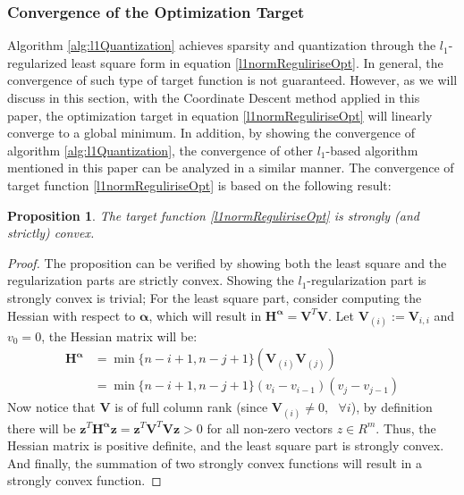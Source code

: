 \documentclass[preprint,10pt]{elsarticle}
\newtheorem{prop}{Proposition}
\begin{document}
\subsubsection{Convergence of the Optimization Target}
\label{subsubsec:convergence}
Algorithm \ref{alg:l1Quantization} achieves sparsity and quantization through the $l_1$-regularized least square form in equation \ref{l1normReguliriseOpt}. In general, the convergence of such type of target function is not guaranteed. However, as we will discuss in this section, with the Coordinate Descent method applied in this paper, the optimization target in equation \ref{l1normReguliriseOpt}  will linearly converge to a global minimum. In addition, by showing the convergence of algorithm \ref{alg:l1Quantization}, the convergence of other $l_1$-based algorithm mentioned in this paper can be analyzed in a similar manner. The convergence of target function \ref{l1normReguliriseOpt} is based on the following result:
\begin{prop}
The target function \ref{l1normReguliriseOpt} is strongly (and strictly) convex.
\end{prop}
\begin{proof}
The proposition can be verified by showing both the least square and the regularization parts are strictly convex. Showing the $l_1$-regularization part is strongly convex is trivial; For the least square part, consider computing the Hessian with respect to $\boldsymbol{\alpha}$, which will result in $\boldsymbol{H^{\alpha}} = \boldsymbol{V}^{T}\boldsymbol{V}$. Let $\boldsymbol{V}_{(i)} := \boldsymbol{V}_{i,i}$ and $v_{0} = 0$, the Hessian matrix will be: 
\begin{equation}
\label{equ:HessianOfLeastSquare}
\begin{split}
\boldsymbol{H^{\alpha}} & = \min\{n-i+1, n-j+1\}(\boldsymbol{V}_{(i)}\boldsymbol{V}_{(j)})\\
& = \min\{n-i+1, n-j+1\}(v_{i}-v_{i-1})(v_{j}-v_{j-1})
\end{split}
\end{equation}
Now notice that $\boldsymbol{V}$ is of full column rank (since $\boldsymbol{V}_{(i)} \neq 0, \text{ } \forall i$), by definition there will be $\boldsymbol{z}^{T}\boldsymbol{H^{\alpha}}\boldsymbol{z}=\boldsymbol{z}^{T}\boldsymbol{V}^{T}\boldsymbol{V}\boldsymbol{z}>0$ for all non-zero vectors $z \in R^{m}$. Thus, the Hessian matrix is positive definite, and the least square part is strongly convex. And finally, the summation of two strongly convex functions will result in a strongly convex function.
\end{proof}
\end{document}
